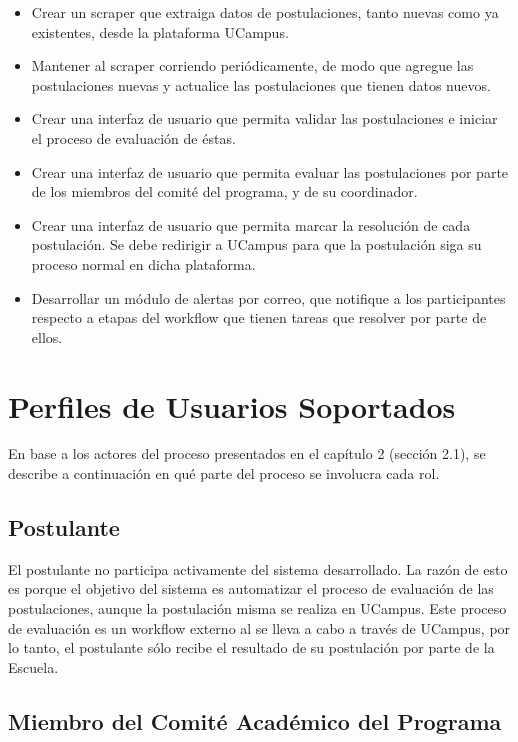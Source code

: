 \begin{itemize}
\item Crear un scraper que extraiga datos de postulaciones, tanto nuevas como ya
existentes, desde la plataforma UCampus.
\item Mantener al scraper corriendo periódicamente, de modo que agregue las
postulaciones nuevas y actualice las postulaciones que tienen datos nuevos.
\item Crear una interfaz de usuario que permita validar las postulaciones e
iniciar el proceso de evaluación de éstas.
\item Crear una interfaz de usuario que permita evaluar las postulaciones por
parte de los miembros del comité del programa, y de su coordinador.
\item Crear una interfaz de usuario que permita marcar la resolución de cada
postulación. Se debe redirigir a UCampus para que la postulación siga su proceso
normal en dicha plataforma.
\item Desarrollar un módulo de alertas por correo, que notifique a los
participantes respecto a etapas del workflow que tienen tareas que resolver por
parte de ellos.
\end{itemize}

\section{Perfiles de Usuarios Soportados}

En base a los actores del proceso presentados en el capítulo 2 (sección 2.1), se
describe a continuación en qué parte del proceso se involucra cada rol.

\subsection{Postulante}

El postulante no participa activamente del sistema desarrollado. La razón de
esto es porque el objetivo del sistema es automatizar el proceso de evaluación
de las postulaciones, aunque la postulación misma se realiza en UCampus. Este
proceso de evaluación es un workflow externo al se lleva a cabo a través de
UCampus, por lo tanto, el postulante sólo recibe el resultado de su postulación
por parte de la Escuela.

\subsection{Miembro del Comité Académico del Programa}


